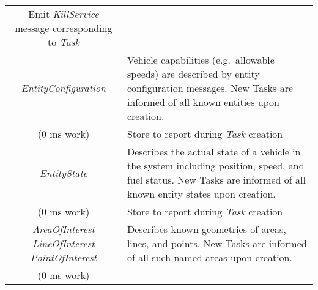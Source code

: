 \begin{longtable}[]{@{}cl@{}}
\begin{minipage}[t]{0.55\columnwidth}
Emit \emph{KillService} message corresponding to \emph{Task}\strut
\end{minipage}\tabularnewline
\begin{minipage}[t]{0.40\columnwidth}\centering\strut
\emph{EntityConfiguration}\strut
\end{minipage} & \begin{minipage}[t]{0.55\columnwidth}\raggedright\strut
Vehicle capabilities (e.g.~allowable speeds) are described by entity
configuration messages. New Tasks are informed of all known entities
upon creation.\strut
\end{minipage}\tabularnewline
\begin{minipage}[t]{0.40\columnwidth}\centering\strut
(0 ms work)\strut
\end{minipage} & \begin{minipage}[t]{0.55\columnwidth}\raggedright\strut
Store to report during \emph{Task} creation\strut
\end{minipage}\tabularnewline
\begin{minipage}[t]{0.40\columnwidth}\centering\strut
\emph{EntityState}\strut
\end{minipage} & \begin{minipage}[t]{0.55\columnwidth}\raggedright\strut
Describes the actual state of a vehicle in the system including
position, speed, and fuel status. New Tasks are informed of all known
entity states upon creation.\strut
\end{minipage}\tabularnewline
\begin{minipage}[t]{0.40\columnwidth}\centering\strut
(0 ms work)\strut
\end{minipage} & \begin{minipage}[t]{0.55\columnwidth}\raggedright\strut
Store to report during \emph{Task} creation\strut
\end{minipage}\tabularnewline
\begin{minipage}[t]{0.40\columnwidth}\centering\strut
\emph{AreaOfInterest} \emph{LineOfInterest} \emph{PointOfInterest}\strut
\end{minipage} & \begin{minipage}[t]{0.55\columnwidth}\raggedright\strut
Describes known geometries of areas, lines, and points. New Tasks are
informed of all such named areas upon creation.\strut
\end{minipage}\tabularnewline
\begin{minipage}[t]{0.40\columnwidth}\centering\strut
(0 ms work)\strut
\end{minipage} & \begin{minipage}[t]{0.55\columnwidth}\raggedright\strut

\end{minipage}
\end{longtable}
